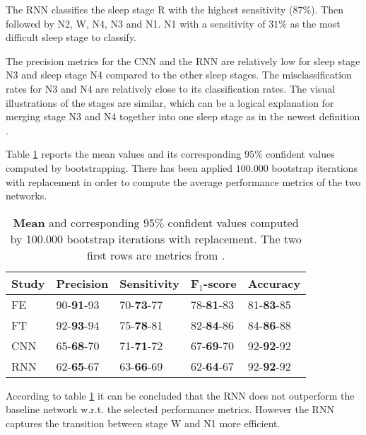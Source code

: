The RNN classifies the sleep stage R with the highest sensitivity ($87\%$). Then followed by N2, W, N4, N3 and N1. N1 with a sensitivity of $31\%$ as the most difficult sleep stage to classify.

The precision metrics for the CNN and the RNN are relatively low for sleep stage N3 and sleep stage N4 compared to the other sleep stages. The misclassification rates for N3 and N4 are relatively close to its classification rates. 
The visual illustrations of the stages are similar, which can be a logical explanation for merging stage N3 and N4 together into one sleep stage as in the newest definition \cite{AASM}.



Table \ref{tab_res_2} reports the mean values and its corresponding $95\%$ confident values computed by bootstrapping. There has been applied $100.000$ bootstrap iterations with replacement in order to compute the average performance metrics of the two networks.
\begin{table}[th!]
\centering
\begin{tabular}{l | llll}
Study & Precision & Sensitivity & F$_1$-score & Accuracy \\\hline
FE \cite{main_ar} & 90-\textbf{91}-93 & 70-\textbf{73}-77 & 78-\textbf{81}-83 & 81-\textbf{83}-85\\
FT \cite{main_ar} & 92-\textbf{93}-94 & 75-\textbf{78}-81 & 82-\textbf{84}-86 & 84-\textbf{86}-88\\\hline
CNN               & 65-\textbf{68}-70 & 71-\textbf{71}-72 & 67-\textbf{69}-70 & 92-\textbf{92}-92\\
RNN               & 62-\textbf{65}-67 & 63-\textbf{66}-69 & 62-\textbf{64}-67 & 92-\textbf{92}-92
\end{tabular}
\caption{\textbf{Mean} and corresponding $95\%$ confident values computed by 100.000 bootstrap iterations with replacement. The two first rows are metrics from \cite{main_ar}.}
\label{tab_res_2}
\end{table}
According to table \ref{tab_res_2} it can be concluded that the RNN does not outperform the baseline network w.r.t. the selected performance metrics. However the RNN captures the transition between stage W and N1 more efficient.

